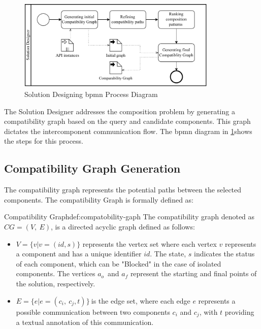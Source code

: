 \begin{figure}[hbt]
\hypertarget{fig:disco-sd}{%
\centering
\includegraphics[width=0.85\textwidth]{../figures/MyFigures/SolutionDesignerBPMN.drawio.pdf}
\captionsetup{justification=centering}
\caption{Solution Designing \gls{bpmn} Process Diagram}\label{fig:disco-sd}
}
\end{figure}

The Solution Designer addresses the composition problem by generating a compatibility graph based on the query and candidate components. This graph dictates the intercomponent communication flow. The \gls{bpmn} diagram in \cref{fig:disco-sd}shows the steps for this process.


\vspace{-15pt}
\hypertarget{sec:graph-gen}{%
\subsection{Compatibility Graph Generation}\label{sec:graph-gen}}
\vspace{10pt}

The compatibility graph represents the potential paths between the selected components. The compatibility Graph is formally defined as:

\begin{thesisdefinition}{Compatibility Graph}{def:compatobility-gaph}
The compatibility graph denoted as
\(CG = (V,\ E)\), is a directed acyclic graph defined as follows:
\begin{itemize}
\item
\(V = \{ v|v = (id,s)\}\) represents the vertex set where each vertex
  \(v\) represents a component and has a unique identifier \(id\). The
  state, \(s\) indicates the status of each component, which can be
  "Blocked" in the case of isolated components. The vertices \(a_{o\ }\)
  and \(a_{f}\) represent the starting and final points of the solution,
  respectively.
\item 
\(E = \{ e|e = (c_{i},\ c_{j},t)\}\ \)is the edge set, where each edge
  \(e\) represents a possible communication between two components
  \(c_{i}\) and \(c_{j}\)\hspace{0pt}, with \(t\) providing a textual
  annotation of this communication.
 
\end{itemize}
\end{thesisdefinition}

